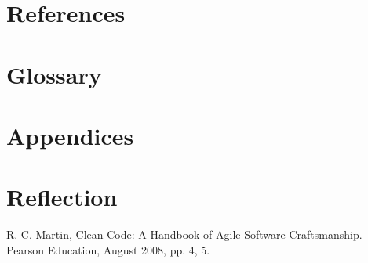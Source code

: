 \documentclass[12pt, letterpaper]{article}
\begin{document}
%
\section{References}

%
\section{Glossary}

%
\section{Appendices}

%
\section{Reflection}

%
\begin{thebibliography}{00}
   R. C. Martin, Clean Code: A Handbook of Agile Software Craftsmanship. Pearson Education, August 2008, pp. 4, 5.
\end{thebibliography}
\end{document}
